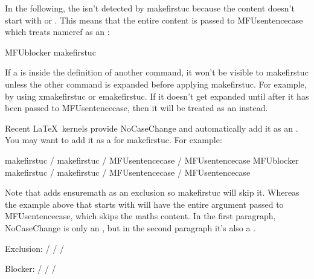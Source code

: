 \documentclass[titlepage=false,oneside,
 fontsize=12pt,captions=tableheading]{scrbook}
\begin{document}
In the following, the  isn't detected by
\gls{makefirstuc} because the content doesn't start with 
 or
. This means that the entire
content is passed to \gls{MFUsentencecase} which treats
\gls{nameref} as an :
\begin{codebox}
\gls{MFUblocker}
\gls{makefirstuc} 
\end{codebox}
\begin{resultbox}
\MFUblocker{\nameref}
\end{resultbox}

\begin{important}
If a  is inside the definition of
another command, it won't be visible to \gls{makefirstuc} unless
the other command is expanded before applying \gls{makefirstuc}.
For example, by using \gls{xmakefirstuc} or \gls{emakefirstuc}.
If it doesn't get expanded until after it has been passed to
\gls{MFUsentencecase}, then it will be treated as an 
instead.
\end{important}

Recent \LaTeX\ kernels provide \gls{NoCaseChange} and automatically
add it as an . You may want to add it as a
 for \gls{makefirstuc}. For example:
\begin{codebox}
\gls{makefirstuc} /
\gls{makefirstuc} /
\gls{MFUsentencecase} /
\gls{MFUsentencecase}
\codepar
\gls{MFUblocker}\comment{}
\gls{makefirstuc} /
\gls{makefirstuc} /
\gls{MFUsentencecase} /
\gls{MFUsentencecase}
\end{codebox}
Note that  adds \gls{ensuremath} as an exclusion so
\gls{makefirstuc} will skip it. Whereas the example above that
starts with  will have the entire argument passed to
\gls{MFUsentencecase}, which skips the maths content. 
In the first paragraph, \gls{NoCaseChange} is only an
, but in the second paragraph it's also a
.
\begin{resultbox}
Exclusion:
 /
 /
 /

Blocker:
\MFUblocker{\NoCaseChange}%
 /
 /
 /
\end{resultbox}
\end{document}

